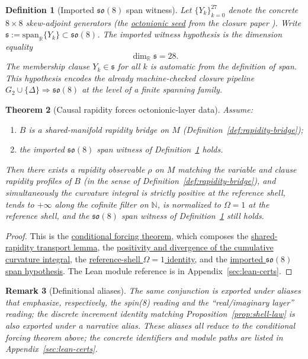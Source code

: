 \documentclass[11pt]{amsart}
\newtheorem{theorem}{Theorem}[section]
\newtheorem{definition}[theorem]{Definition}
\newtheorem{remark}[theorem]{Remark}
\begin{document}
\begin{definition}[Imported \(\mathfrak{so}(8)\) span witness]
\label{def:so8-span-witness}
Let \(\{Y_k\}_{k=0}^{27}\) denote the concrete \(8\times 8\) skew-adjoint generators (the \hyperref[lean:so8-generators]{octonionic seed} from the closure paper \cite{hqiv-so8-paper}). Write \(\mathfrak{s}:=\mathrm{span}_{\mathbb{R}}\{Y_k\}\subset \mathfrak{so}(8)\). The \emph{imported witness hypothesis} is the dimension equality
\[
\dim_{\mathbb{R}}\mathfrak{s}=28.
\]
The membership clause \(Y_k\in\mathfrak{s}\) for all \(k\) is automatic from the definition of span. This hypothesis encodes the already machine-checked closure pipeline \(G_2\cup\{\Delta\}\Rightarrow\mathfrak{so}(8)\) at the level of a finite spanning family.
\end{definition}

\begin{theorem}[Causal rapidity forces octonionic-layer data]
\label{thm:lean-forcing}
Assume:
\begin{enumerate}
  \item \(B\) is a shared-manifold rapidity bridge on \(M\) (Definition~\ref{def:rapidity-bridge});
  \item the imported \(\mathfrak{so}(8)\) span witness of Definition~\ref{def:so8-span-witness} holds.
\end{enumerate}
Then there exists a rapidity observable \(\rho\) on \(M\) matching the variable and clause rapidity profiles of \(B\) (in the sense of Definition~\ref{def:rapidity-bridge}), and simultaneously the curvature integral is strictly positive at the reference shell, tends to \(+\infty\) along the cofinite filter on \(\mathbb{N}\), is normalized to \(\Omega = 1\) at the reference shell, and the \(\mathfrak{so}(8)\) span witness of Definition~\ref{def:so8-span-witness} still holds.
\end{theorem}

\begin{proof}
This is the \hyperref[lean:forcing-theorem]{conditional forcing theorem}, which composes the \hyperref[lean:rapidity-induces]{shared-rapidity transport lemma}, the \hyperref[lean:curvature-int]{positivity and divergence of the cumulative curvature integral}, the \hyperref[lean:omega-ref]{reference-shell \(\Omega=1\) identity}, and the \hyperref[lean:so8-witness]{imported \(\mathfrak{so}(8)\) span hypothesis}. The Lean module reference is in Appendix~\ref{sec:lean-certs}.
\end{proof}

\begin{remark}[Definitional aliases]
The same conjunction is exported under aliases that emphasize, respectively, the spin(8) reading and the ``real/imaginary layer'' reading; the discrete increment identity matching Proposition~\ref{prop:shell-law} is also exported under a narrative alias. These aliases all reduce to the conditional forcing theorem above; the concrete identifiers and module paths are listed in Appendix~\ref{sec:lean-certs}.
\end{remark}
\end{document}
